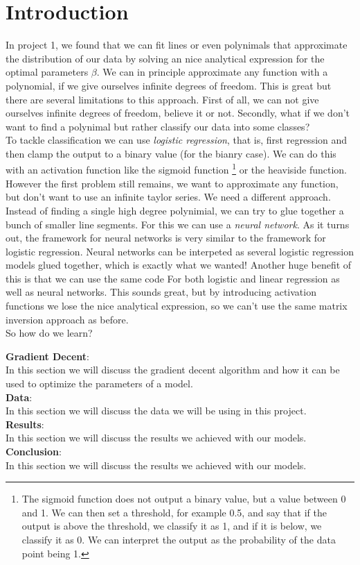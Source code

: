 \documentclass[twoside,11pt]{report}
\begin{document}
\section{Introduction}




In project 1\cite{MachineLearningProjects_2023}, we found that 
we can fit lines or even polynimals that approximate the distribution of our data by solving an nice analytical expression for the optimal parameters $\beta$. We can in principle approximate 
any function with a polynomial, if we give ourselves infinite degrees of freedom. This is great but there are several
limitations to this approach. First of all, we can not give ourselves infinite degrees of freedom, believe it or not.
Secondly, what if we don't want to find a polynimal but rather classify our data into some classes?\\

\noindent
To tackle classification we can use \emph{logistic regression}, that is, first regression and then clamp the output to a binary value
(for the bianry case). We can do this with an activation function like the sigmoid function
\footnote{The sigmoid function does not output a binary value, but a value between 0 and 1. 
    We can then set a threshold, for example 0.5, and say that if the output is above the threshold, 
    we classify it as 1, and if it is below, we classify it as 0. We can interpret the output as the 
probability of the data point being 1.}
or the heaviside function. However the first problem
still remains, we want to approximate any function, but don't want to use an infinite taylor series. 
We need a different approach.
Instead of finding a single high degree polynimial, we can try to glue together a bunch of smaller line segments.
For this we can use a \emph{neural network}.
As it turns out, the framework for neural networks is very similar to the framework for logistic regression.
Neural networks can be interpeted as several logistic regression models glued together, which is exactly what we wanted!
Another huge benefit of this is that we can use the same code
For both logistic and linear regression as well as neural networks.
This sounds great, but by introducing activation functions we lose the nice analytical expression,
so we can't use the same matrix inversion approach as before.\\
So how do we learn?


\noindent
\textbf{Gradient Decent}:\\ 
    In this section we will discuss the gradient decent algorithm and how it can be used to
    optimize the parameters of a model.\\
\textbf{Data}: \\
    In this section we will discuss the data we will be using in this project.\\
\textbf{Results}:\\
    In this section we will discuss the results we achieved with our models.\\
\textbf{Conclusion}:\\
    In this section we will discuss the results we achieved with our models.\\
\end{document}
